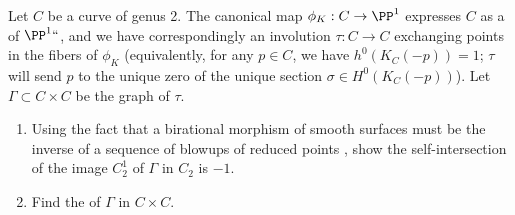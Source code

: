 \begin{exercise}\label{blowup of $J(C)$ at a point}
Let $C$ be a curve of genus 2. The canonical map $\phi_K : C \to
\PP^1$ expresses $C$ as a 
%
 of $\PP^1` `$, and we have
correspondingly an involution $\tau : C \to C$ exchanging points in
the fibers of $\phi_K$ (equivalently, for any $p \in C$, we have
$h^0(K_C(-p)) = 1$; $\tau$ will send $p$ to the unique zero of the
unique section $\sigma \in H^0(K_C(-p))$). Let $\Gamma \subset C
\times C$ be the graph of $\tau$.
\begin{enumerate}
\item Using the fact that a birational morphism of smooth surfaces
%
  must be the inverse of a sequence of blowups of reduced points
  \cite[V.5.5]{Hartshorne1977}, show the self-intersection of the
  image $C^1_2$ of $\Gamma$ in $C_2$ is $-1$.
\item Find the 
%
of $\Gamma$ in $C \times C$.
\end{enumerate}
\end{exercise}



